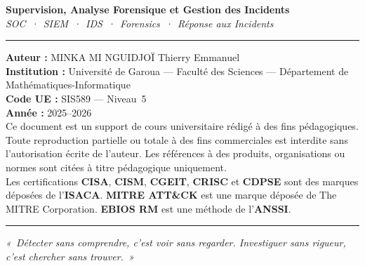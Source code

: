 \documentclass[12pt, a4paper, twoside, openright]{book}
\begin{document}
\begin{center}
    \begin{minipage}{0.78\textwidth}
        \footnotesize\color{CouleurBordInfo}
        \begin{center}
            {\bfseries\color{CouleurPrimaire}
                Supervision, Analyse Forensique et Gestion des Incidents}\\[0.4ex]
            {\itshape SOC~·~SIEM~·~IDS~·~Forensics~·~Réponse aux Incidents}
        \end{center}
        \vspace{0.8ex}
        \hrule
        \vspace{0.8ex}
        \textbf{Auteur :} MINKA MI NGUIDJOÏ Thierry Emmanuel\\
        \textbf{Institution :} Université de Garoua — Faculté des Sciences — Département de Mathématiques-Informatique\\
        \textbf{Code UE :} SIS589 — Niveau~5\\
        \textbf{Année :} 2025--2026\\[0.5ex]
        Ce document est un support de cours universitaire rédigé à des fins
        pédagogiques. Toute reproduction partielle ou totale à des fins
        commerciales est interdite sans l'autorisation écrite de l'auteur.
        Les références à des produits, organisations ou normes sont citées
        à titre pédagogique uniquement.\\[0.5ex]
        Les certifications \textbf{CISA}, \textbf{CISM}, \textbf{CGEIT},
        \textbf{CRISC} et \textbf{CDPSE} sont des marques déposées de
        l'\textbf{ISACA}. \textbf{MITRE ATT\&CK} est une marque déposée
        de The MITRE Corporation. \textbf{EBIOS RM} est une méthode
        de l'\textbf{ANSSI}.\\[0.5ex]
        \hrule
        \vspace{0.5ex}
        {\centering\itshape
        «~Détecter sans comprendre, c'est voir sans regarder.
        Investiguer sans rigueur, c'est chercher sans trouver.~»}
    \end{minipage}
\end{center}

\vspace*{\fill}
\end{document}
